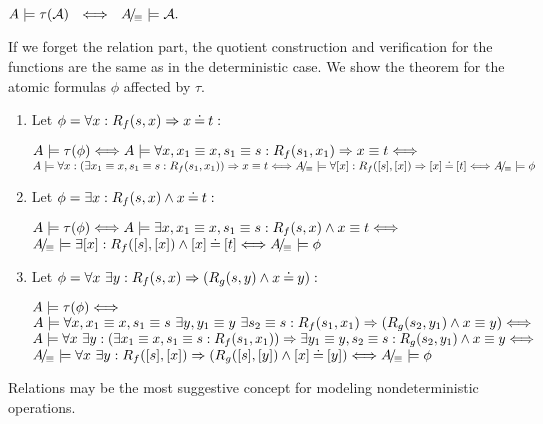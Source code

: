 \begin{THEOREM}\label{th:relcorrect}
$A\models \tau({\cal A})\ \ \mathrel{\Longleftrightarrow}\ \ A\!{\textstyle /}\!_\equiv\models {\cal A}.$ \end{THEOREM}
\begin{PROOF}
If we forget the relation part, the quotient construction and verification for the functions are the same as in the deterministic case. We show the theorem for the atomic formulas $\phi$ affected by $\tau$. \begin{enumerate}\MyLPar
\item Let $\phi = \forall x:R_{f}(s,x)\mathrel\Rightarrow x\mathbin{\doteq} t:$ 

$A\models \tau(\phi) \mathrel{\Longleftrightarrow}
A\models \forall x, x_1\equiv x, s_1\equiv s : R_{f}(s_1,x_1)\mathrel\Rightarrow x\equiv t
\mathrel{\Longleftrightarrow} $\\
$A\models \forall x:(\exists x_1\equiv x,s_1\equiv s : R_{f}(s_1,x_1))\mathrel\Rightarrow x\equiv t \mathrel{\Longleftrightarrow}
A\!{\textstyle /}\!_\equiv\models \forall [x]:R_{f}([s],[x])\mathrel\Rightarrow [x]\mathbin{\doteq} [t] \mathrel{\Longleftrightarrow} A\!{\textstyle /}\!_\equiv\models \phi$
\item Let $\phi = \exists x:R_{f}(s,x)\land x\mathbin{\doteq} t:$ 

$A\models \tau(\phi) \mathrel{\Longleftrightarrow}
A\models \exists x, x_1\equiv x, s_1\equiv s: R_{f}(s,x) \land x\equiv t \mathrel{\Longleftrightarrow} $\\
$A\!{\textstyle /}\!_\equiv \models \exists [x]:R_{f}([s],[x])\land [x]\mathbin{\doteq} [t] \mathrel{\Longleftrightarrow} A\!{\textstyle /}\!_\equiv \models \phi$
\item Let $\phi = \forall x\ \exists y : 
R_{f}(s,x)\mathrel\Rightarrow (R_{g}(s,y)\land x\mathbin{\doteq} y):$ 

$A\models \tau(\phi) \mathrel{\Longleftrightarrow} $\\
$A\models \forall x,x_1\equiv x,s_1\equiv s\ \exists y,y_1\equiv y\ \exists s_2\equiv s :
\Pre Rf(s_1,x_1)\impl (\Pre Rg(s_2,y_1)\land x\equiv y) \ifff $\\ $A\models \forall x\ \exists y :(\exists x_1\equiv x,s_1\equiv s : R_{f}(s_1,x_1))\mathrel\Rightarrow \exists y_1\equiv y,s_2\equiv s : R_{g}(s_2,y_1)\land
x\equiv y \mathrel{\Longleftrightarrow} $\\
$A\!{\textstyle /}\!_\equiv \models \forall x\ \exists y : R_{f}([s],[x])\mathrel\Rightarrow 
(R_{g}([s],[y])\land [x]\mathbin{\doteq} [y]) \mathrel{\Longleftrightarrow} A\!{\textstyle /}\!_\equiv \models \phi $
\end{enumerate}
\end{PROOF}
Relations may be the most suggestive concept for modeling nondeterministic operations.

